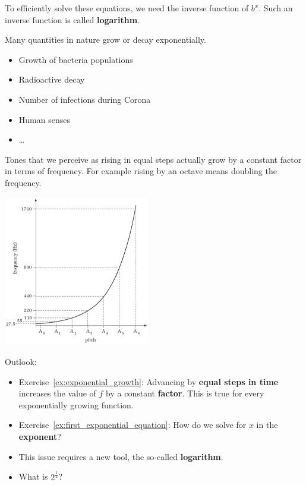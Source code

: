 To efficiently solve these equations, we need the inverse function of $b^x$.
Such an inverse function is called \textbf{logarithm}.
\begin{tcolorbox}
	Many quantities in nature grow or decay exponentially.
	\begin{itemize}
		\item Growth of bacteria populations
		\item Radioactive decay
		\item Number of infections during Corona
		\item Human senses
		\item \ldots
	\end{itemize}
\end{tcolorbox}
\begin{example}
	Tones that we perceive as rising in equal steps actually grow by a constant factor in terms of frequency.
	For example rising by an octave means doubling the frequency.
	\begin{center}
	\includegraphics[width=0.48\textwidth]{images/octave}
	\end{center}
\end{example}
\begin{tcolorbox}
	Outlook:
	\begin{itemize}
		\item Exercise~\ref{ex:exponential_growth}: Advancing by \textbf{equal steps in time} increases the value of $f$ by a constant \textbf{factor}.
		This is true for every exponentially growing function.
		\item Exercise~\ref{ex:first_exponential_equation}: How do we solve for $x$ in the \textbf{exponent}?
		\item This issue requires a new tool, the so-called \textbf{logarithm}.
		\item What is $2^{\frac{1}{2}}$?
	\end{itemize}
\end{tcolorbox}
